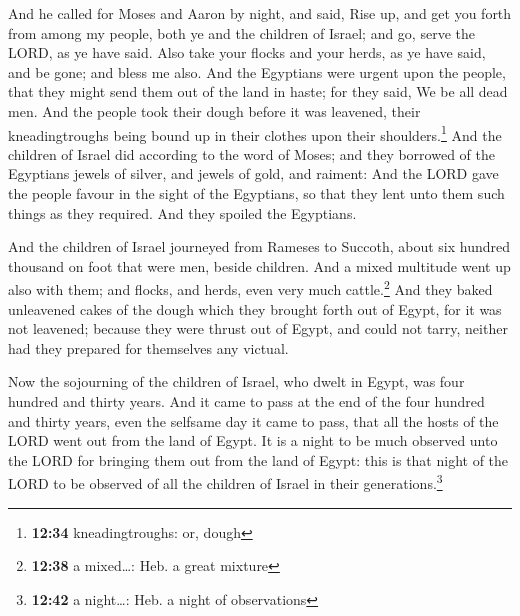  And he called for Moses and Aaron by night, and said,
Rise up, and get you forth from among my people, both ye and the
children of Israel; and go, serve the LORD, as ye have said.
 Also take your flocks and your herds, as ye have said,
and be gone; and bless me also.  And the Egyptians were
urgent upon the people, that they might send them out of the land in
haste; for they said, We be all dead men.  And the people
took their dough before it was leavened, their kneadingtroughs being
bound up in their clothes upon their shoulders.\footnote{\textbf{12:34}
  kneadingtroughs: or, dough}  And the children of Israel
did according to the word of Moses; and they borrowed of the Egyptians
jewels of silver, and jewels of gold, and raiment:  And
the LORD gave the people favour in the sight of the Egyptians, so that
they lent unto them such things as they required. And they spoiled the
Egyptians.

 And the children of Israel journeyed from Rameses to
Succoth, about six hundred thousand on foot that were men, beside
children.  And a mixed multitude went up also with them;
and flocks, and herds, even very much cattle.\footnote{\textbf{12:38} a
  mixed\ldots: Heb. a great mixture}  And they baked
unleavened cakes of the dough which they brought forth out of Egypt, for
it was not leavened; because they were thrust out of Egypt, and could
not tarry, neither had they prepared for themselves any victual.

 Now the sojourning of the children of Israel, who dwelt
in Egypt, was four hundred and thirty years.  And it came
to pass at the end of the four hundred and thirty years, even the
selfsame day it came to pass, that all the hosts of the LORD went out
from the land of Egypt.  It is a night to be much
observed unto the LORD for bringing them out from the land of Egypt:
this is that night of the LORD to be observed of all the children of
Israel in their generations.\footnote{\textbf{12:42} a night\ldots: Heb.
  a night of observations}

